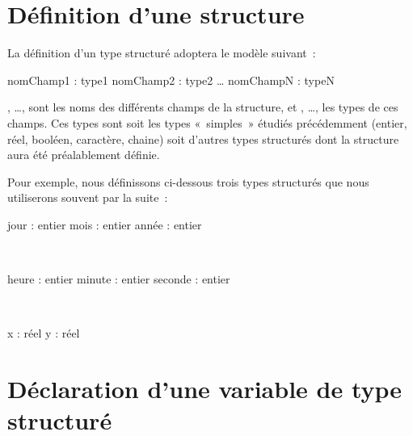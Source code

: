 \section{Définition d’une structure}

	La définition d’un type structuré adoptera le modèle suivant~:

	\begin{Pseudocode}
		\Decl nomChamp1 : type1
		\Decl nomChamp2 : type2
		\Decl \dots
		\Decl nomChampN : typeN
	\EndStruct
	\end{Pseudocode}

	, \dots, \pseudocode{nomChampN} 
	sont les noms des différents champs de la structure, 
	et , \dots, \pseudocode{typeN} 
	les types de ces champs. 
	Ces types sont soit les types «~simples~» étudiés
	précédemment (entier, réel, booléen, caractère, chaine) soit d’autres
	types structurés dont la structure aura été préalablement définie.

	Pour exemple, nous définissons ci-dessous trois
	types structurés que nous utiliserons souvent par la suite~:

	\begin{minipage}{4.5cm}
	\begin{Pseudocode}
	\Struct{Date}
		\Decl jour : entier
		\Decl mois : entier
		\Decl année : entier
	\EndStruct
	\end{Pseudocode}
	\end{minipage}
\ 
	\begin{minipage}{4.5cm}
	\begin{Pseudocode}
		\Decl heure : entier
		\Decl minute : entier
		\Decl seconde : entier
	\EndStruct
	\end{Pseudocode}
	\end{minipage}
\ 
	\begin{minipage}{4.5cm}
	\begin{Pseudocode}
		\Decl x : réel
		\Decl y : réel
	\EndStruct{}
	\Empty
	\end{Pseudocode}
	\end{minipage}

\section{Déclaration d’une variable de type structuré}

